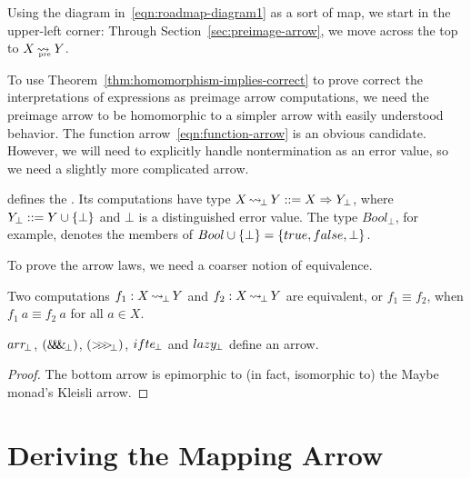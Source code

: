 Using the diagram in~\eqref{eqn:roadmap-diagram1} as a sort of map, we start in the upper-left corner:
Through Section~\ref{sec:preimage-arrow}, we move across the top to $X \operatorname{\rightsquigarrow_{\mspace{-19mu}_\mathrm{pre}}} Y$.

To use Theorem~\ref{thm:homomorphism-implies-correct} to prove correct the interpretations of expressions as preimage arrow computations, we need the preimage arrow to be homomorphic to a simpler arrow with easily understood behavior.
The function arrow~\eqref{eqn:function-arrow} is an obvious candidate.
However, we will need to explicitly handle nontermination as an error value, so we need a slightly more complicated arrow.

 defines the .
Its computations have type $X \operatorname{\rightsquigarrow_{\mspace{-3mu}\bot}} Y ::= X \Rightarrow Y_\bot$, where $Y_\bot ::= Y \cup \{{\bot}\}$ and $\bot$ is a distinguished error value.
The type $Bool_\bot$, for example, denotes the members of $Bool \cup \{{\bot}\} = \{{true,false,\bot}\}$.

To prove the arrow laws, we need a coarser notion of equivalence.

\begin{definition}
Two computations $f_1 : X \operatorname{\rightsquigarrow_{\mspace{-3mu}\bot}} Y$ and $f_2 : X \operatorname{\rightsquigarrow_{\mspace{-3mu}\bot}} Y$ are equivalent, or $f_1 \equiv f_2$, when $f_1~a \equiv f_2~a$ for all $a \in X$.
\end{definition}

\begin{theorem}
$arr_{\mspace{-3mu}\bot}$, $(\mathit{\&\mspace{-7.5mu}\&\mspace{-7.5mu}\&}_{\mspace{-3mu}\bot})$, $({>}\mspace{-6mu}{>}\mspace{-6mu}{>}_{\mspace{-5mu}\bot})$, $ifte_{\mspace{-2mu}\bot}$ and $lazy_{\mspace{-2mu}\bot}$ define an arrow.
\end{theorem}
\begin{proof}
The bottom arrow is epimorphic to (in fact, isomorphic to) the Maybe monad's Kleisli arrow.
\end{proof}

\section{Deriving the Mapping Arrow}

